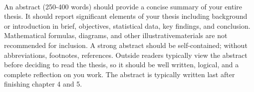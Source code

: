 \MakeUppercase{\thesisTitle}\\
An abstract (250-400 words) should provide a concise summary of your entire thesis. It should report significant elements of your thesis including background or introduction in brief, objectives, statistical data, key findings, and conclusion. Mathematical formulas, diagrams, and other illustrativematerials are not recommended for inclusion. A strong abstract should be self-contained; without abbreviations, footnotes, references. Outside readers typically view the abstract before deciding to read the thesis, so it should be well written, logical, and a complete reflection on you work. The abstract is typically written last after finishing chapter 4 and 5.

